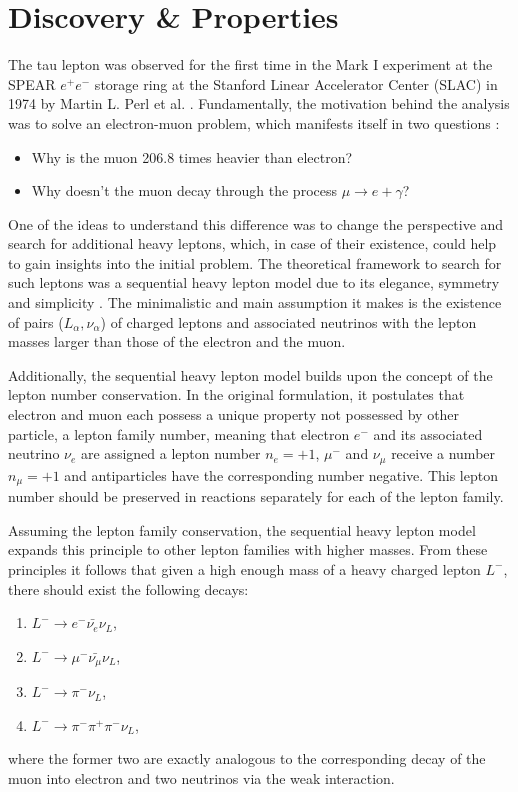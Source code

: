 \section{Discovery \& Properties} \label{tau-intro}

The tau lepton was observed for the first time in the Mark I experiment at the SPEAR $e^+e^-$ storage ring at the Stanford Linear Accelerator Center (SLAC) in 1974 by Martin L. Perl et al. \cite{Perl:1975bf}. Fundamentally, the motivation \cite{Perl:1992ad} behind the analysis was to solve  an electron-muon problem, which manifests itself in two questions \cite{Perl:1996dk}:
\begin{itemize}
    \item Why is the muon 206.8 times heavier than electron?
    \item Why doesn’t the muon decay through the process $\mu \to e + \gamma$?
\end{itemize}

One of the ideas to understand this difference was to change the perspective and search for additional heavy leptons, which, in case of their existence, could help to gain insights into the initial problem. The theoretical framework to search for such leptons was a sequential heavy lepton model due to its elegance, symmetry and simplicity \cite{Perl:past_future}. The minimalistic and main assumption it makes is the existence of pairs ($L_\alpha, \nu_\alpha$) of charged leptons and associated neutrinos with the lepton masses larger than those of the electron and the muon. 

Additionally, the sequential heavy lepton model builds upon the concept of the lepton number conservation. In the original formulation, it postulates that electron and muon each possess a unique property not possessed by other particle, a lepton family number, meaning that electron $e^-$ and its associated neutrino $\nu_e$ are assigned a lepton number $n_e = +1$, $\mu^-$ and $\nu_\mu$ receive a number $n_\mu = +1$ and antiparticles have the corresponding number negative. This lepton number should be preserved in reactions separately for each of the lepton family.

Assuming the lepton family conservation, the sequential heavy lepton model expands this principle to other lepton families with higher masses.  From these principles it follows that given a high enough mass of a heavy charged lepton $L^-$, there should exist the following decays:
\begin{enumerate}[label=D\arabic*]
    \item \label{Ltoe} $L^- \to e^- \bar{\nu_e} \nu_L $, 
    \item \label{Ltomu} $L^- \to \mu^- \bar{\nu_\mu} \nu_L $,
    \item $L^- \to \pi^- \nu_L $,
    \item $L^- \to \pi^-\pi^+\pi^- \nu_L $,
\end{enumerate}
where the former two are exactly analogous to the corresponding decay of the muon into electron and two neutrinos via the weak interaction.


